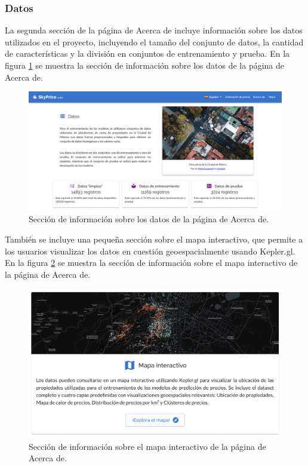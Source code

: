 \subsubsection{Datos}
La segunda sección de la página de Acerca de incluye información sobre los datos
utilizados en el proyecto, incluyendo el tamaño del conjunto de datos, la cantidad
de características y la división en conjuntos de entrenamiento y prueba. En la figura
\ref{fig:acerca-de-datos} se muestra la sección de información sobre los datos de la
página de Acerca de.

\begin{figure}[H]
    \centering
    \includegraphics[width=1.0\textwidth]{imagenes/05-implementacion/interfaz-grafica/acerca-de-datos.png}
    \caption{Sección de información sobre los datos de la página de Acerca de.}
    \label{fig:acerca-de-datos}
\end{figure}

También se incluye una pequeña sección sobre el mapa interactivo, que permite a los
usuarios visualizar los datos en cuestión geoespacialmente usando Kepler.gl. En la
figura \ref{fig:acerca-de-mapa} se muestra la sección de información sobre el mapa
interactivo de la página de Acerca de.

\begin{figure}[H]
    \centering
    \includegraphics[width=1.0\textwidth]{imagenes/05-implementacion/interfaz-grafica/acerca-de-mapa.png}
    \caption{Sección de información sobre el mapa interactivo de la página de Acerca de.}
    \label{fig:acerca-de-mapa}
\end{figure}


